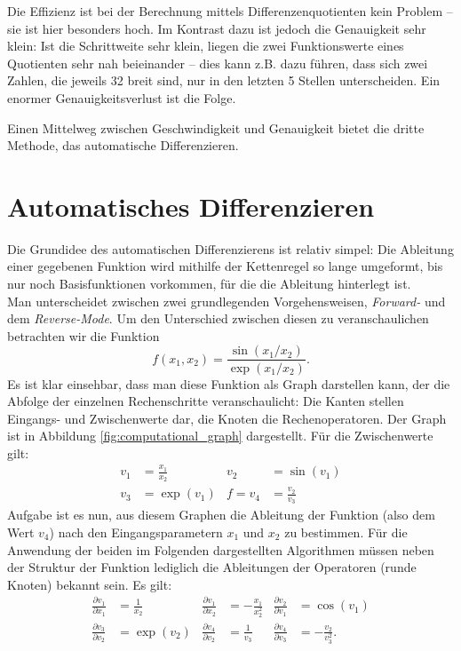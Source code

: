 \documentclass{scrartcl}
\begin{document}
Die Effizienz ist bei der Berechnung mittels Differenzenquotienten kein Problem -- sie ist hier besonders hoch. Im Kontrast dazu ist jedoch die Genauigkeit sehr klein: Ist die Schrittweite sehr klein, liegen die zwei Funktionswerte eines Quotienten sehr nah beieinander -- dies kann z.B. dazu führen, dass sich zwei Zahlen, die jeweils \SI{32}{\Bit} breit sind, nur in den letzten 5 Stellen unterscheiden. Ein enormer Genauigkeitsverlust ist die Folge.\par
Einen Mittelweg zwischen Geschwindigkeit und Genauigkeit bietet die dritte Methode, das automatische Differenzieren.
\section{Automatisches Differenzieren}
Die Grundidee des automatischen Differenzierens ist relativ simpel: Die Ableitung einer gegebenen Funktion wird mithilfe der Kettenregel so lange umgeformt, bis nur noch Basisfunktionen vorkommen, für die die Ableitung hinterlegt ist.\\
Man unterscheidet zwischen zwei grundlegenden Vorgehensweisen, \emph{Forward-} und dem \emph{Reverse-Mode}.
Um den Unterschied zwischen diesen zu veranschaulichen betrachten wir die Funktion 
\begin{equation}
f(x_1, x_2) = \frac{\sin(x_1/x_2)}{\exp(x_1/x_2)}. \label{eq:example_func}
\end{equation}
Es ist klar einsehbar, dass man diese Funktion als Graph darstellen kann, der die Abfolge der einzelnen Rechenschritte veranschaulicht: Die Kanten stellen Eingangs- und Zwischenwerte dar, die Knoten die Rechenoperatoren. Der Graph ist in Abbildung \ref{fig:computational_graph} dargestellt. Für die Zwischenwerte gilt:
\begin{equation*}
\begin{aligned}
	v_1 &= \frac{x_1}{x_2} &
	v_2 &= \sin(v_1) \\
	v_3 &= \exp(v_1) &
	f = v_4 &= \frac{v_2}{v_3}
\end{aligned}
\end{equation*}
Aufgabe ist es nun, aus diesem Graphen die Ableitung der Funktion (also dem Wert $v_4$) nach den Eingangsparametern $x_1$ und $x_2$ zu bestimmen. Für die Anwendung der beiden im Folgenden dargestellten Algorithmen müssen neben der Struktur der Funktion lediglich die Ableitungen der Operatoren (runde Knoten) bekannt sein. Es gilt:
\begin{equation*}
\begin{aligned}
	\tfrac{\partial v_1}{\partial x_1} &= \tfrac{1}{x_2} &
	\tfrac{\partial v_1}{\partial x_2} &= -\tfrac{x_1}{x_2^2} &
	\tfrac{\partial v_2}{\partial v_1} &= \cos(v_1) \\
	\tfrac{\partial v_3}{\partial v_2} &= \exp(v_2) &
	\tfrac{\partial v_4}{\partial v_2} &= \tfrac{1}{v_3} &
	\tfrac{\partial v_4}{\partial v_3} &= -\tfrac{v_2}{v_3^2}.
\end{aligned}
\end{equation*}
\end{document}
